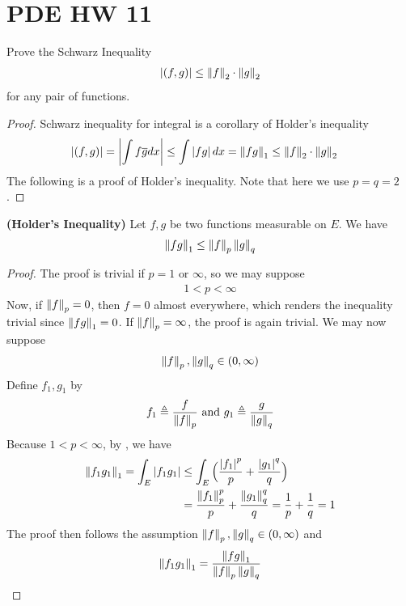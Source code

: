 \documentclass{report}
\begin{document}
\section{PDE HW 11}
\begin{question}{}{}
Prove the Schwarz Inequality 
\begin{align*}
\left| (f,g)\right| \leq \left\| f \right\|_2 \cdot \left\| g \right\|_2
\end{align*}
for any pair of functions. 
\end{question}
\begin{proof}
Schwarz inequality for integral is a corollary of Holder's inequality 
\begin{align*}
\left|(f,g)\right|&= \left|\int f \overline{g}dx\right|\leq \int \left|fg\right|dx = \left\| fg \right\|_1 \leq \left\| f \right\|_2 \cdot \left\| g \right\|_2 
\end{align*}
The following is a proof of Holder's inequality. Note that here we use $p=q=2$. 
\end{proof}
\begin{theorem}
\label{HI}
\textbf{(Holder's Inequality)} Let $f,g$ be two functions measurable on $E$. We have 
 \begin{align*}
\left\| fg \right\|_1 \leq \left\| f \right\|_p \left\| g \right\|_q
\end{align*}
\end{theorem}
\begin{proof}
The proof is trivial if $p=1\text{ or }\infty$, so we may suppose
\begin{align*}
1< p <\infty
\end{align*}
Now, if $\left\| f \right\|_p=0$, then $f=0$ almost everywhere, which renders the inequality trivial since $\left\| fg \right\|_1=0$. If $\left\| f \right\|_p=\infty$, the proof is again trivial. We may now suppose  
\begin{align*}
\left\| f \right\|_p , \left\| g \right\|_q \in (0,\infty)
\end{align*}
Define $f_1,g_1$ by 
\begin{align*}
f_1 \triangleq \frac{f}{\left\| f \right\|_p} \text{ and }g_1 \triangleq \frac{g}{\left\| g \right\|_q}
\end{align*}
Because $1<p<\infty$, by  , we have
\begin{align*}
  \left\| f_1g_1 \right\|_1=\int_E \left|f_1g_1\right| &\leq \int_E \Big( \frac{\left|f_1\right|^p}{p}+ \frac{\left|g_1\right|^q}{q} \Big) \\
&= \frac{\left\| f_1 \right\|_p^p}{p} + \frac{\left\| g_1 \right\|_q^q}{q}= \frac{1}{p}+ \frac{1}{q}=1
\end{align*}
The proof then follows the assumption $\left\| f \right\|_p,\left\| g \right\|_q \in (0,\infty)$ and  
\begin{align*}
\left\| f_1g_1 \right\|_1= \frac{\left\| fg \right\|_1}{\left\| f \right\|_p \left\| g \right\|_q}
\end{align*}
\end{proof}
\end{document}
